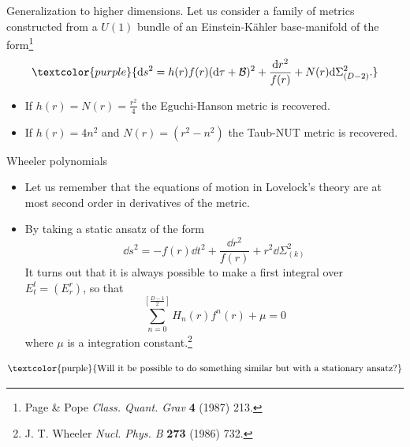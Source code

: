 \documentclass[aspectratio=169,xcolor=dvipsnames]{beamer}
\begin{document}
\begin{frame}\justifying
{}
\begin{block}{Generalization to higher dimensions.}
    Let us consider a family of metrics constructed from a $U(1)$ bundle of an Einstein-K\"ahler base-manifold of the form\footnote{Page \& Pope \textit{Class. Quant. Grav} \textbf{4} (1987) 213.}
    \begin{equation*}
        \textcolor{purple}{\dd s^2=h(r)f(r)(\dd\tau+\mathcal{B})^2+\frac{\dd r^2}{f(r)}+N(r)\dd\Sigma^2_{(D-2)}.}
    \end{equation*}
\end{block}
    \begin{itemize}
    \item If $h(r)=N(r)=\frac{r^2}{4}$ the Eguchi-Hanson metric is recovered.
    \item If $h(r)=4n^2$ and $N(r)=(r^2-n^2)$ the Taub-NUT metric is recovered.
\end{itemize}
\end{frame}

\begin{frame}{Wheeler polynomials}\justifying
\begin{itemize}
    \item Let us remember that the equations of motion in Lovelock's theory are at most second order in derivatives of the metric.
    \item By taking a static ansatz of the form
    \begin{equation*}
        \dd s^2=-f(r)\dd t^2+\frac{\dd r^2}{f(r)}+r^2\dd\Sigma^2_{(k)}
    \end{equation*}
    It turns out that it is always possible to make a first integral over $E^t_t = (E^r_r)$, so that
    \begin{equation*}
    \sum_{n=0}^{\left[\frac{D-1}{2}\right]}H_n(r)f^n(r)+\mu = 0
\end{equation*}
where $\mu$ is a integration constant.\footnote{J. T. Wheeler \textit{Nucl. Phys. B} \textbf{273} (1986) 732.}
\end{itemize}
\end{frame}

\begin{frame}
    $$\text{\textcolor{purple}{Will it be possible to do something similar but with a stationary ansatz?}}$$
\end{frame}
\end{document}
